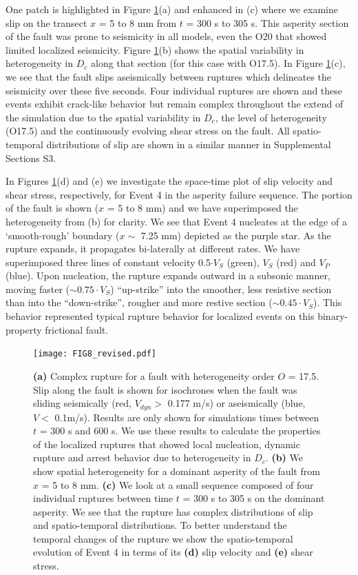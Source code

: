 \documentclass[preprint,1p, 10pt,authoryear]{elsarticle}
\begin{document}
One patch is highlighted in Figure \ref{fig8}(a) and enhanced in (c) where we examine slip on the transect $x$ = 5 to 8 mm from $t$ = 300 s to 305 s.  This asperity section of the fault was prone to seismicity in all models, even the O20 that showed limited localized seismicity. Figure \ref{fig8}(b) shows the spatial variability in heterogeneity in $D_{c}$ along that section (for this case with O17.5). In Figure \ref{fig8}(c), we see that the fault slips aseismically between ruptures which delineates the seismicity over these five seconds. Four individual ruptures are shown and these events exhibit crack-like behavior but remain complex throughout the extend of the simulation due to the spatial variability in $D_{c}$, the level of heterogeneity (O17.5) and the continuously evolving shear stress on the fault.  All spatio-temporal distributions of slip are shown in a similar manner in Supplemental Sections S3.

In Figures \ref{fig8}(d) and (e) we investigate the space-time plot of slip velocity and shear stress, respectively, for Event 4 in the asperity failure sequence. The portion of the fault is shown ($x$ = 5 to 8 mm) and we have superimposed the heterogeneity from (b) for clarity. We see that Event 4 nucleates at the edge of a `smooth-rough' boundary ($x \sim$ 7.25 mm) depicted as the purple star. As the rupture expands, it propagates bi-laterally at different rates. We have superimposed three lines of constant velocity 0.5$\cdot V_{S}$ (green), $V_{S}$ (red) and $V_{P}$ (blue).  Upon nucleation, the rupture expands outward in a subsonic manner, moving faster ($\sim 0.75 \cdot V_{S}$) ``up-strike'' into the smoother, less resistive section than into the ``down-strike'', rougher and more restive section ($\sim 0.45\cdot V_{S}$). This behavior represented typical rupture behavior for localized events on this binary-property frictional fault.

\begin{figure}
	\centering
	\texttt{[image: FIG8\_revised.pdf]} 
	\caption{\textbf{(a)} Complex rupture for a fault with heterogeneity order $O$ = 17.5. Slip along the fault is shown for isochrones when the fault was sliding seismically (red, $V_{dyn}>$ 0.177 m/s) or aseismically (blue, $V <$ 0.1m/s).  Results are only shown for simulations times between $t$ = 300 s and 600 s. We use these results to calculate the properties of the localized ruptures that showed local nucleation, dynamic rupture and arrest behavior due to heterogeneity in $D_{c}$. \textbf{(b)} We show spatial heterogeneity for a dominant asperity of the fault from $x$ = 5 to 8 mm. \textbf{(c)} We look at a small sequence composed of four individual ruptures between time $t$ = 300 s to 305 s on the dominant asperity.  We see that the rupture has complex distributions of slip and spatio-temporal distributions. To better understand the temporal changes of the rupture we show the spatio-temporal evolution of Event 4 in terms of its \textbf{(d)} slip velocity and \textbf{(e)} shear stress.}
	\label{fig8}
\end{figure}
\end{document}
